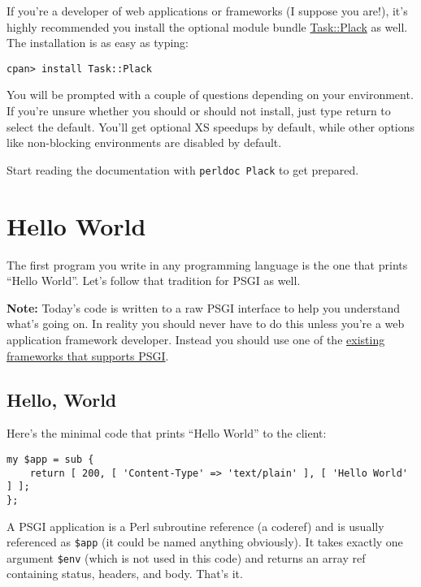 If you're a developer of web applications or frameworks (I suppose you
are!), it's highly recommended you install the optional module bundle
\href{http://search.cpan.org/dist/Task-Plack}{Task::Plack} as well. The
installation is as easy as typing:

\begin{lstlisting}
cpan> install Task::Plack
\end{lstlisting}

You will be prompted with a couple of questions depending on your
environment. If you're unsure whether you should or should not install,
just type return to select the default. You'll get optional XS speedups
by default, while other options like non-blocking environments are
disabled by default.

Start reading the documentation with \lstinline!perldoc Plack! to get
prepared.

\chapter{Hello World}\label{day-2-hello-world}

The first program you write in any programming language is the one that
prints ``Hello World''. Let's follow that tradition for PSGI as well.

\textbf{Note:} Today's code is written to a raw PSGI interface to help
you understand what's going on. In reality you should never have to do
this unless you're a web application framework developer. Instead you
should use one of the \href{http://plackperl.org/\#frameworks}{existing
frameworks that supports PSGI}.

\section{Hello, World}\label{hello-world}

Here's the minimal code that prints ``Hello World'' to the client:

\begin{lstlisting}
my $app = sub {
    return [ 200, [ 'Content-Type' => 'text/plain' ], [ 'Hello World' ] ];
};
\end{lstlisting}

A PSGI application is a Perl subroutine reference (a coderef) and is
usually referenced as \lstinline!$app! (it could be named anything
obviously). It takes exactly one argument \lstinline!$env! (which is not
used in this code) and returns an array ref containing status, headers,
and body. That's it.

